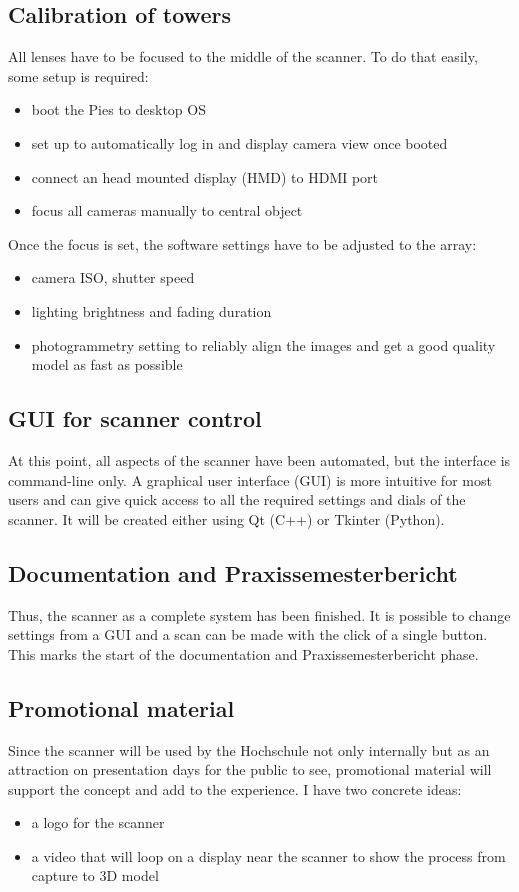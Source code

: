 \subsection{Calibration of towers}
	All lenses have to be focused to the middle of the scanner. To do that easily, some setup is required:
	\begin{itemize}
		\item boot the Pies to desktop OS
		\item set up to automatically log in and display camera view once booted
		\item connect an head mounted display (HMD) to HDMI port
		\item focus all cameras manually to central object
	\end{itemize}
	Once the focus is set, the software settings have to be adjusted to the array:
	\begin{itemize}
		\item camera ISO, shutter speed
		\item lighting brightness and fading duration
		\item photogrammetry setting to reliably align the images and get a good quality model as fast as possible
	\end{itemize}

\subsection{GUI for scanner control}
	At this point, all aspects of the scanner have been automated, but the interface is command-line only. A graphical user interface (GUI) is more intuitive for most users and can give quick access to all the required settings and dials of the scanner. It will be created either using Qt (C++) or Tkinter (Python).
	
\subsection{Documentation and Praxissemesterbericht}
	Thus, the scanner as a complete system has been finished. It is possible to change settings from a GUI and a scan can be made with the click of a single button. This marks the start of the documentation and Praxissemesterbericht phase.
	
\subsection{Promotional material}	
	Since the scanner will be used by the Hochschule not only internally but as an attraction on presentation days for the public to see, promotional material will support the concept and add to the experience. I have two concrete ideas:
	\begin{itemize}
		\item a logo for the scanner
		\item a video that will loop on a display near the scanner to show the process from capture to 3D model
	\end{itemize}

